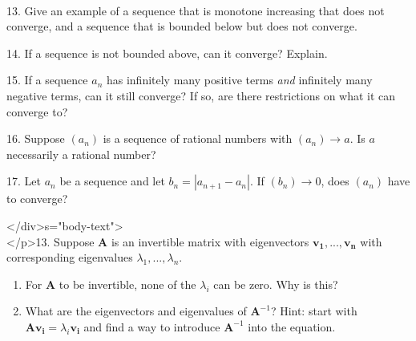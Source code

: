 \documentclass{article}
\begin{document}
~\\

13. Give an example of a sequence that is monotone increasing that does not converge, and a sequence that is bounded below but does not converge.

14. If a sequence is not bounded above, can it converge? Explain.

15. If a sequence $a_n$ has infinitely many positive terms \textit{and} infinitely many negative terms, can it still converge? If so, are there restrictions on what it can converge to?

16. Suppose $(a_n)$ is a sequence of rational numbers with $(a_n) \to a$. Is $a$ necessarily a rational number?

17. Let $a_n$ be a sequence and let $b_n = \left| a_{n + 1} - a_n \right|$. If $(b_n) \to 0$, does $(a_n)$ have to converge?

</div>s="body-text">
~\\</p>13. Suppose $\mathbf{A}$ is an invertible matrix with eigenvectors $\mathbf{v_1}, ..., \mathbf{v_n}$ with corresponding eigenvalues $\lambda_1, ..., \lambda_n$.

\begin{enumerate}

	\item For $\mathbf{A}$ to be invertible, none of the $\lambda_i$ can be zero. Why is this?

	\item What are the eigenvectors and eigenvalues of $\mathbf{A}^{-1}$? Hint: start with $\mathbf{Av_i} = \lambda_i \mathbf{v_i}$ and find a way to introduce $\mathbf{A}^{-1}$ into the equation.

\end{enumerate}
\end{document}

